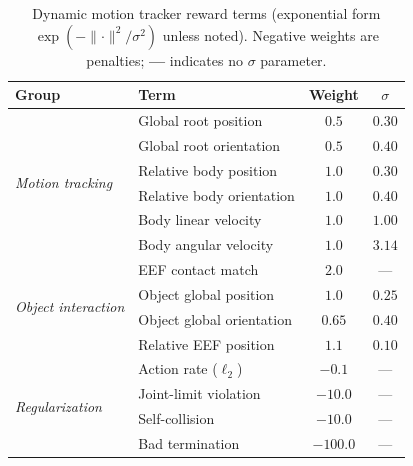\documentclass{article}
\begin{document}
\begin{table}[tp]
\centering
\caption{Dynamic motion tracker reward terms (exponential form $\exp(-\lVert\cdot\rVert^2/\sigma^2)$ unless noted). Negative weights are penalties; \textbf{---} indicates no $\sigma$ parameter.}
\label{tab:tracker_rewards}
\small
\begin{tabular}{@{}llcc@{}}
\toprule
\textbf{Group} & \textbf{Term} & \textbf{Weight} & $\sigma$ \\
\midrule
\multirow{6}{*}{\textit{Motion tracking}}
 & Global root position      & $0.5$   & $0.30$ \\
 & Global root orientation   & $0.5$   & $0.40$ \\
 & Relative body position    & $1.0$   & $0.30$ \\
 & Relative body orientation & $1.0$   & $0.40$ \\
 & Body linear velocity      & $1.0$   & $1.00$ \\
 & Body angular velocity     & $1.0$   & $3.14$ \\
\cmidrule(l){2-4}
\multirow{4}{*}{\textit{Object interaction}}
 & EEF contact match         & $2.0$   & ---    \\
 & Object global position    & $1.0$   & $0.25$ \\
 & Object global orientation & $0.65$  & $0.40$ \\
 & Relative EEF position     & $1.1$   & $0.10$ \\
\cmidrule(l){2-4}
\multirow{4}{*}{\textit{Regularization}}
 & Action rate ($\ell_2$)    & $-0.1$   & ---    \\
 & Joint-limit violation     & $-10.0$  & ---    \\
 & Self-collision            & $-10.0$  & ---    \\
 & Bad termination           & $-100.0$ & ---    \\
\bottomrule
\end{tabular}
\end{table}
\end{document}
